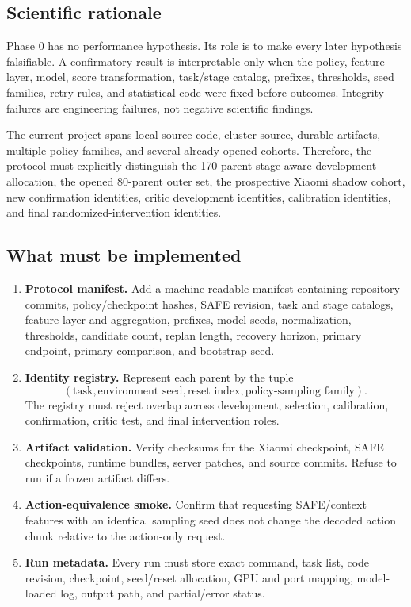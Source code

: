 
\subsection{Scientific rationale}

Phase 0 has no performance hypothesis. Its role is to make every later hypothesis falsifiable. A confirmatory result is interpretable only when the policy, feature layer, model, score transformation, task/stage catalog, prefixes, thresholds, seed families, retry rules, and statistical code were fixed before outcomes. Integrity failures are engineering failures, not negative scientific findings.

The current project spans local source code, cluster source, durable artifacts, multiple policy families, and several already opened cohorts. Therefore, the protocol must explicitly distinguish the 170-parent stage-aware development allocation, the opened 80-parent outer set, the prospective Xiaomi shadow cohort, new confirmation identities, critic development identities, calibration identities, and final randomized-intervention identities.

\subsection{What must be implemented}

\begin{enumerate}
  \item \textbf{Protocol manifest.} Add a machine-readable manifest containing repository commits, policy/checkpoint hashes, SAFE revision, task and stage catalogs, feature layer and aggregation, prefixes, model seeds, normalization, thresholds, candidate count, replan length, recovery horizon, primary endpoint, primary comparison, and bootstrap seed.
  \item \textbf{Identity registry.} Represent each parent by the tuple
  \[
    (\text{task},\text{environment seed},\text{reset index},\text{policy-sampling family}).
  \]
  The registry must reject overlap across development, selection, calibration, confirmation, critic test, and final intervention roles.
  \item \textbf{Artifact validation.} Verify checksums for the Xiaomi checkpoint, SAFE checkpoints, runtime bundles, server patches, and source commits. Refuse to run if a frozen artifact differs.
  \item \textbf{Action-equivalence smoke.} Confirm that requesting SAFE/context features with an identical sampling seed does not change the decoded action chunk relative to the action-only request.
  \item \textbf{Run metadata.} Every run must store exact command, task list, code revision, checkpoint, seed/reset allocation, GPU and port mapping, model-loaded log, output path, and partial/error status.
\end{enumerate}

